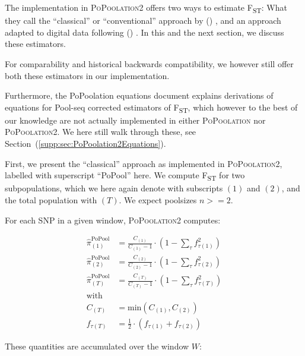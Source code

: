 \documentclass[a4paper,9pt,DIV=14]{scrartcl}
\newcounter{todo}
\newcommand\todo[1]{}
\newcommand\toolname{\textsc}
\newcommand\secref[1]{Section~(\ref{#1})}
\newcommand{\fst}{F\textsubscript{ST}}
\newcommand\citeay[1]{\citeauthor{#1} (\citeyear{#1}) \cite{#1}}
\begin{document}
The implementation in \toolname{PoPoolation2} \cite{Kofler2011b} offers two ways to estimate \fst{}:
What they call the ``classical'' or ``conventional'' approach by \citeay{Hartl2007}, and an approach adapted to digital data following \citeay{Karlsson2007}.
In this and the next section, we discuss these estimators.
\todo{contingent on Jeff's simulations, i.e., to be added later: We also show that they are biased, and hence recommend to use our novel estimates as introduced above instead.}
For comparability and historical backwards compatibility, we however still offer both these estimators in our implementation.

\todo{see if we actually get to do this in time:}
Furthermore, the PoPoolation equations document explains derivations of equations for Pool-seq corrected estimators of \fst, which however to the best of our knowledge are not actually implemented in either \toolname{PoPoolation} nor \toolname{PoPoolation2}.
We here still walk through these, see \secref{supp:sec:PoPoolation2Equations}.

First, we present the ``classical'' approach as implemented in \toolname{PoPoolation2}, labelled with superscript ``PoPool'' here.
We compute \fst{} for two subpopulations, which we here again denote with subscripts $(1)$ and $(2)$, and the total population with $(T)$. We expect poolsizes $n >= 2$.

For each SNP in a given window, \toolname{PoPoolation2} computes:

\begin{align}
    \label{eq:PoPoolation2FstPi:1}
    \widehat{\pi}_{(1)}^\text{PoPool}  &= \frac{C_{(1)}}{C_{(1)}-1} \cdot  \left( 1 - \sum_\tau f_{\tau(1)}^2 \right) \\
    \label{eq:PoPoolation2FstPi:2}
    \widehat{\pi}_{(2)}^\text{PoPool}  &= \frac{C_{(2)}}{C_{(2)}-1} \cdot  \left( 1 - \sum_\tau f_{\tau(2)}^2 \right) \\
    \label{eq:PoPoolation2FstPi:T}
    \widehat{\pi}_{(T)}^\text{PoPool}  &= \frac{C_{(T)}}{C_{(T)}-1} \cdot  \left( 1 - \sum_\tau f_{\tau(T)}^2 \right) \\
    \nonumber
    \mbox{with} \\
    \nonumber
    C_{(T)} &= \mbox{min} \left( C_{(1)}, C_{(2)} \right) \\
    \nonumber
    f_{\tau(T)} &= \frac{1}{2} \cdot \left( f_{\tau(1)} + f_{\tau(2)} \right)
\end{align}

These quantities are accumulated over the window $W$:
\end{document}
